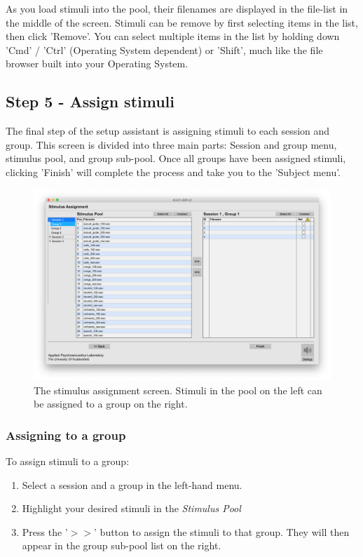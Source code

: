 \noindent
As you load stimuli into the pool, their filenames are displayed in the file-list in the middle of the screen. Stimuli can be remove by first selecting items in the list, then click 'Remove'. You can select multiple items in the list by holding down 'Cmd' / 'Ctrl' (Operating System dependent) or 'Shift', much like the file browser built into your Operating System.
\pagebreak

\subsection{Step 5 - Assign stimuli}
The final step of the setup assistant is assigning stimuli to each session and group. This screen is divided into three main parts: Session and group menu, stimulus pool, and group sub-pool. Once all groups have been assigned stimuli, clicking 'Finish' will complete the process and take you to the 'Subject menu'.

\begin{figure}[ht]
	\centering
	\includegraphics[width=1.0\textwidth]{./images/createTest_step06_stimulusAssign.png}
	\caption{The stimulus assignment screen. Stimuli in the pool on the left can be assigned to a group on the right.}
	\label{create::stimulusAssign}
\end{figure}

\subsubsection{Assigning to a group}
To assign stimuli to a group:
\begin{enumerate}
	\item Select a session and a group in the left-hand menu.
	\item Highlight your desired stimuli in the \emph{Stimulus Pool}
	\item Press the '$>>$' button to assign the stimuli to that group. They will then appear in the group sub-pool list on the right.
\end{enumerate}

